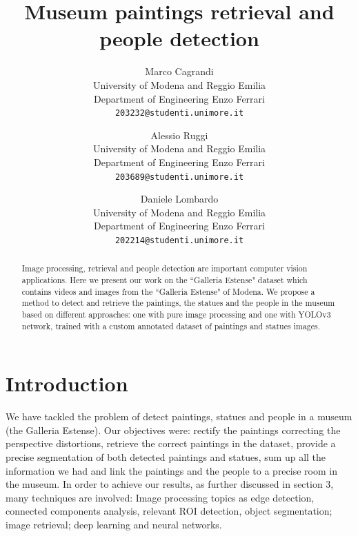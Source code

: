 \documentclass[10pt,twocolumn,letterpaper]{article}
\begin{document}
\title{Museum paintings retrieval and people detection}

\author{Marco Cagrandi\\
University of Modena and Reggio Emilia\\
Department of Engineering Enzo Ferrari\\
{\tt\small 203232@studenti.unimore.it}
\and
Alessio Ruggi\\
University of Modena and Reggio Emilia\\
Department of Engineering Enzo Ferrari\\
{\tt\small 203689@studenti.unimore.it}
\and
Daniele Lombardo\\
University of Modena and Reggio Emilia\\
Department of Engineering Enzo Ferrari\\
{\tt\small 202214@studenti.unimore.it}
}


\maketitle

\begin{abstract}
   Image processing, retrieval and people detection
   are important computer vision applications.
   Here we present our work on the ``Galleria Estense" dataset which contains
   videos and images from the ``Galleria Estense" of Modena.
   We propose a method to detect and retrieve the paintings, the statues and the people in the 
   museum based on different approaches: one with pure image processing and one 
   with YOLOv3 network, trained with a custom annotated dataset of paintings and statues 
   images. 
\end{abstract}

\section{Introduction}

We have tackled the problem of detect paintings, statues and people in a museum (the Galleria Estense).
Our objectives were: rectify the paintings correcting the perspective distortions, retrieve the correct paintings in the dataset, provide a precise segmentation of both detected paintings and statues, sum up all the information we had and link the paintings and the people to a precise room in the museum.
 In order to achieve our results, as further discussed in section 3, many techniques are involved: Image processing topics as edge detection, connected components analysis, relevant ROI detection, object segmentation; image retrieval; deep learning and neural networks. 
\end{document}
